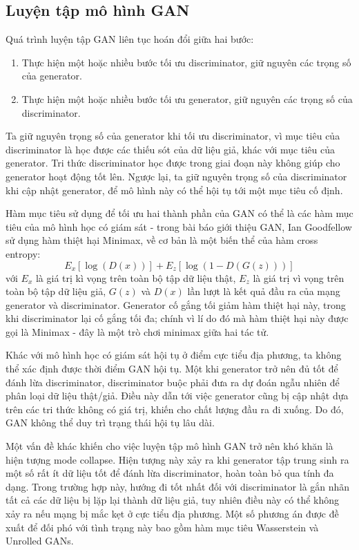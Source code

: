 \documentclass[12pt]{extreport}
\begin{document}
\subsection{Luyện tập mô hình GAN}
\label{gan}

Quá trình luyện tập GAN liên tục hoán đổi giữa hai bước:
\begin{enumerate}
    \item Thực hiện một hoặc nhiều bước tối ưu discriminator, giữ nguyên các trọng số của generator.
    \item Thực hiện một hoặc nhiều bước tối ưu generator, giữ nguyên các trọng số của discriminator.
\end{enumerate}

Ta giữ nguyên trọng số của generator khi tối ưu discriminator, vì mục tiêu của discriminator là học được các thiếu sót của dữ liệu giả, khác với mục tiêu của generator. Tri thức discriminator học được trong giai đoạn này không giúp cho generator hoạt động tốt lên. Ngược lại, ta giữ nguyên trọng số của discriminator khi cập nhật generator, để mô hình này có thể hội tụ tới một mục tiêu cố định.

Hàm mục tiêu sử dụng để tối ưu hai thành phần của GAN có thể là các hàm mục tiêu của mô hình học có giám sát - trong bài báo giới thiệu GAN, Ian Goodfellow sử dụng hàm thiệt hại Minimax, về cơ bản là một biến thể của hàm cross entropy:
$$ E_x[\log(D(x))] + E_z[\log(1 - D(G(z)))] $$
với $ E_x $ là giá trị kì vọng trên toàn bộ tập dữ liệu thật, $ E_z $ là giá trị vì vọng trên toàn bộ tập dữ liệu giả, $ G(z) $ và $ D(x) $ lần lượt là kết quả đầu ra của mạng generator và discriminator. Generator cố gắng tối giảm hàm thiệt hại này, trong khi discriminator lại cố gắng tối đa; chính vì lí do đó mà hàm thiệt hại này được gọi là Minimax - đây là một trò chơi minimax giữa hai tác tử.

Khác với mô hình học có giám sát hội tụ ở điểm cực tiểu địa phương, ta không thể xác định được thời điểm GAN hội tụ. Một khi generator trở nên đủ tốt để đánh lừa discriminator, discriminator buộc phải đưa ra dự đoán ngẫu nhiên để phân loại dữ liệu thật/giả. Điều này dẫn tới việc generator cũng bị cập nhật dựa trên các tri thức không có giá trị, khiến cho chất lượng đầu ra đi xuống. Do đó, GAN không thể duy trì trạng thái hội tụ lâu dài.

Một vấn đề khác khiến cho việc luyện tập mô hình GAN trở nên khó khăn là hiện tượng mode collapse. Hiện tượng này xảy ra khi generator tập trung sinh ra một số rất ít dữ liệu tốt để đánh lừa discriminator, hoàn toàn bỏ qua tính đa dạng. Trong trường hợp này, hướng đi tốt nhất đối với discriminator là gắn nhãn tất cả các dữ liệu bị lặp lại thành dữ liệu giả, tuy nhiên điều này có thể không xảy ra nếu mạng bị mắc kẹt ở cực tiểu địa phương. Một số phương án được đề xuất để đối phó với tình trạng này bao gồm hàm mục tiêu Wasserstein và Unrolled GANs.
\end{document}
